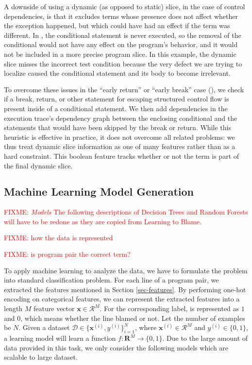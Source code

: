 \documentclass[conference]{IEEEtran}
\newcommand{\fixme}[1]{\textcolor{red}{FIXME: #1}}
\begin{document}
A downside of using a dynamic (as opposed to static) slice, in the case of
control dependencies, is that it excludes terms whose presence does not
affect whether the exception happened, but which could have had an effect
if the term was different. In
, the conditional statement is never
executed, so the removal of the conditional would not have any effect on
the program's behavior, and it would not be included in a more precise
program slice. In this example, the dynamic slice misses the incorrect
test condition because the very defect we are trying to localize
caused the conditional statement and its body to become irrelevant.

To overcome these issues in the ``early return'' or ``early break'' case
(), we check if a break, return, or other statement for
escaping structured control flow is present inside of a conditional
statement. We then add dependencies in the execution trace's dependency graph
between the enclosing conditional and the statements that would have been skipped
by the break or return. While this heuristic is effective in practice, it
does not overcome all related problems: we thus treat dynamic slice
information as one of many features rather than as a hard constraint.
This boolean feature tracks whether or not the term is part of the final
dynamic slice.

\subsection{Machine Learning Model Generation}
\label{sec-model}

\fixme{
\emph{Models} The following descriptions of Decision Trees and
Random Forests will have to be redone as they are copied from Learning to Blame.
}

\fixme{how the data is represented}

\fixme{is program pair the correct term?}

To apply machine learning to analyze the data, we have to formulate the
problem into standard classification problem.
For each line of a program pair, we extracted the features mentioned in
Section \ref{sec-features}.
By performing one-hot encoding on categorical features, we can represent the
extracted features into a length $M$ feature vector $\mathbf{x} \in
\mathcal{R}^{M}$.
For the corresponding label, is represented as $1$ and $0$, which means whether
the line blamed or not.
Let the number of examples be $N$.
Given a dataset $\mathcal{D} \in \{\mathbf{x}^{(i)}, y^{(i)}\}^{N}_{i=1}$,
where $\mathbf{x}^{(i)} \in \mathcal{R}^{M}$ and $y^{(i)} \in \{0, 1\}$,
a learning model will learn a function $f: \mathbf{R}^{M} \to \{0, 1\}$.
Due to the large amount of data provided in this task, we only consider the
following models which are scalable to large dataset.
\end{document}
